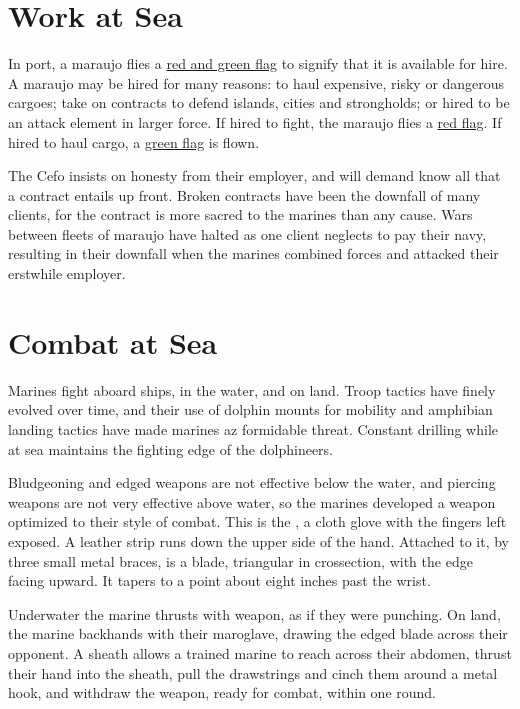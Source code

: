 \begin{multicols*}{2}
\section{Work at Sea}

In port, a maraujo flies a \ul{red and green flag} to signify that it is available for hire. A maraujo may be hired
for many reasons: to haul expensive, risky or dangerous cargoes; take on contracts to defend islands, cities and strongholds; or hired to be an attack element in larger force. If hired to fight, the maraujo flies a \ul{red flag}. If hired to haul cargo, a \ul{green flag} is flown.

The Cefo insists on honesty from their employer, and will demand know all that a contract entails up front. Broken contracts have been the downfall of many clients, for the contract is more sacred to the marines than any cause. Wars between fleets of maraujo have halted as one client neglects to pay their navy, resulting in their downfall when the marines combined forces and attacked their erstwhile employer.

\section{Combat at Sea}

Marines fight aboard ships, in the water, and on land. Troop tactics have finely evolved over time, and their use of dolphin mounts for mobility and amphibian landing tactics have made marines az formidable threat. Constant drilling while at sea maintains the fighting edge of the dolphineers.

Bludgeoning and edged weapons are not effective below the water, and piercing weapons are not very effective above water, so the marines developed a weapon optimized to their style of combat. This is the , a cloth glove with the fingers left exposed. A leather strip runs down the
upper side of the hand. Attached to it, by three small metal braces, is a blade, triangular in crossection, with the edge
facing upward. It tapers to a point about eight inches past the wrist.

Underwater the marine thrusts with weapon, as if they were punching. On land, the marine backhands with their maroglave, drawing the edged blade across their opponent. A sheath allows a trained marine to reach across their abdomen, thrust their hand into the sheath, pull the drawstrings and cinch them around a metal hook, and withdraw the weapon, ready for combat, within one round.


\end{multicols*}
